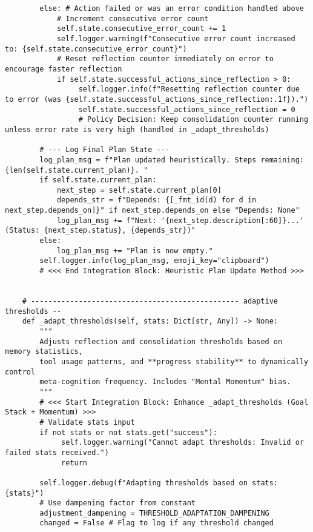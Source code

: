 \documentclass[12pt,a4paper]{article}
\begin{document}
\begin{pageablecode}
\begin{verbatim}
        else: # Action failed or was an error condition handled above
            # Increment consecutive error count
            self.state.consecutive_error_count += 1
            self.logger.warning(f"Consecutive error count increased to: {self.state.consecutive_error_count}")
            # Reset reflection counter immediately on error to encourage faster reflection
            if self.state.successful_actions_since_reflection > 0:
                 self.logger.info(f"Resetting reflection counter due to error (was {self.state.successful_actions_since_reflection:.1f}).")
                 self.state.successful_actions_since_reflection = 0
                 # Policy Decision: Keep consolidation counter running unless error rate is very high (handled in _adapt_thresholds)

        # --- Log Final Plan State ---
        log_plan_msg = f"Plan updated heuristically. Steps remaining: {len(self.state.current_plan)}. "
        if self.state.current_plan:
            next_step = self.state.current_plan[0]
            depends_str = f"Depends: {[_fmt_id(d) for d in next_step.depends_on]}" if next_step.depends_on else "Depends: None"
            log_plan_msg += f"Next: '{next_step.description[:60]}...' (Status: {next_step.status}, {depends_str})"
        else:
            log_plan_msg += "Plan is now empty."
        self.logger.info(log_plan_msg, emoji_key="clipboard")
        # <<< End Integration Block: Heuristic Plan Update Method >>>


    # ------------------------------------------------ adaptive thresholds --
    def _adapt_thresholds(self, stats: Dict[str, Any]) -> None:
        """
        Adjusts reflection and consolidation thresholds based on memory statistics,
        tool usage patterns, and **progress stability** to dynamically control
        meta-cognition frequency. Includes "Mental Momentum" bias.
        """
        # <<< Start Integration Block: Enhance _adapt_thresholds (Goal Stack + Momentum) >>>
        # Validate stats input
        if not stats or not stats.get("success"):
             self.logger.warning("Cannot adapt thresholds: Invalid or failed stats received.")
             return

        self.logger.debug(f"Adapting thresholds based on stats: {stats}")
        # Use dampening factor from constant
        adjustment_dampening = THRESHOLD_ADAPTATION_DAMPENING
        changed = False # Flag to log if any threshold changed


\end{verbatim}
\end{pageablecode}
\end{document}
